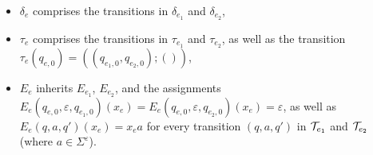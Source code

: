 \begin{itemize}
			\item $\delta_e$ comprises the transitions in $\delta_{e_1}$ and $\delta_{e_2}$,
			\item $\tau_e$ comprises the transitions in $\tau_{e_1}$ and $\tau_{e_2}$, as well as the transition $\tau_e(q_{e,0}) = ((q_{e_1,0},q_{e_2,0}); ())$,
			\item $E_e$ inherits $E_{e_1}$, $E_{e_2}$, and the assignments $E_e(q_{e,0}, \varepsilon, q_{e_1,0})(x_{e}) = E_e(q_{e,0}, \varepsilon, q_{e_2,0})(x_{e}) =\varepsilon$, as well as $E_e(q,a, q')(x_{e}) = x_e a$ for every transition $(q, a, q')$ in $\mathcal{T}_{e_1}$ and $\mathcal{T}_{e_2}$ (where $a \in \Sigma^\varepsilon$).
\end{itemize}
